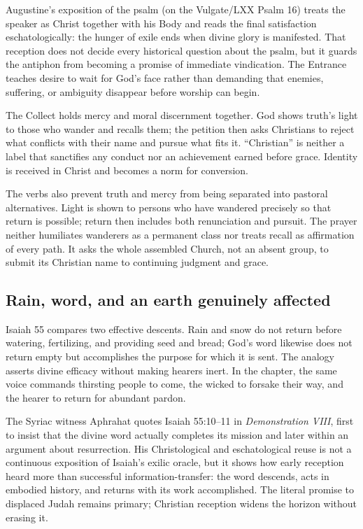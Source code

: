 \begin{deepstudy}
Augustine's exposition of the psalm (on the Vulgate/LXX Psalm 16) treats the speaker as Christ together with his Body and reads the final satisfaction eschatologically: the hunger of exile ends when divine glory is manifested. That reception does not decide every historical question about the psalm, but it guards the antiphon from becoming a promise of immediate vindication. The Entrance teaches desire to wait for God's face rather than demanding that enemies, suffering, or ambiguity disappear before worship can begin.

The Collect holds mercy and moral discernment together. God shows truth's light to those who wander and recalls them; the petition then asks Christians to reject what conflicts with their name and pursue what fits it. “Christian” is neither a label that sanctifies any conduct nor an achievement earned before grace. Identity is received in Christ and becomes a norm for conversion.

The verbs also prevent truth and mercy from being separated into pastoral alternatives. Light is shown to persons who have wandered precisely so that return is possible; return then includes both renunciation and pursuit. The prayer neither humiliates wanderers as a permanent class nor treats recall as affirmation of every path. It asks the whole assembled Church, not an absent group, to submit its Christian name to continuing judgment and grace.

\subsection*{Rain, word, and an earth genuinely affected\enspace{}}

Isaiah 55 compares two effective descents. Rain and snow do not return before watering, fertilizing, and providing seed and bread; God's word likewise does not return empty but accomplishes the purpose for which it is sent. The analogy asserts divine efficacy without making hearers inert. In the chapter, the same voice commands thirsting people to come, the wicked to forsake their way, and the hearer to return for abundant pardon.

The Syriac witness Aphrahat quotes Isaiah 55:10--11 in \emph{Demonstration VIII}, first to insist that the divine word actually completes its mission and later within an argument about resurrection. His Christological and eschatological reuse is not a continuous exposition of Isaiah's exilic oracle, but it shows how early reception heard more than successful information-transfer: the word descends, acts in embodied history, and returns with its work accomplished. The literal promise to displaced Judah remains primary; Christian reception widens the horizon without erasing it.


\end{deepstudy}
